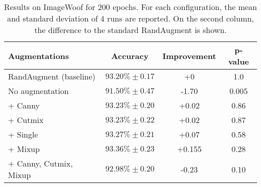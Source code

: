 \begin{table}[h]
    \centering
    \begin{tabular}{|l|c|c|c|}
        \hline
        \textbf{Augmentations} & \textbf{Accuracy} & \textbf{Improvement} & p-value \\
        \hline
        RandAugment (baseline) & $93.20\% \pm 0.17$ & +0 & 1.0 \\
        \hline
        \hline
        No augmentation & $91.50\% \pm 0.47$ & -1.70 &  0.005 \\
        \hline
        + Canny & $93.23\% \pm 0.20$ & +0.02 &  0.86 \\
        \hline
        + Cutmix & $93.23\% \pm 0.22$ & +0.02 & 0.87 \\
        \hline
        + Single & $93.27 \% \pm 0.21$ & +0.07 &  0.58 \\
        \hline
        + Mixup & $93.36\% \pm 0.23$ & +0.155 & 0.28 \\
        \hline
        \hline
        + Canny, Cutmix, Mixup & $92.98\% \pm 0.20$ & -0.23 & 0.10 \\
        \hline
    \end{tabular}
    \caption{Results on ImageWoof for 200 epochs. For each configuration, the mean and standard deviation of 4 runs are reported. On the second column, the difference to the standard RandAugment is shown.}
    \label{tab:imagenette-randaugment}
\end{table}
